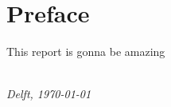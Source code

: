 \chapter*{Preface}

This report is gonna be amazing

\begin{flushright}
{\makeatletter\itshape
    \@author \\
    Delft, \monthyeardate\today
\makeatother}
\end{flushright}